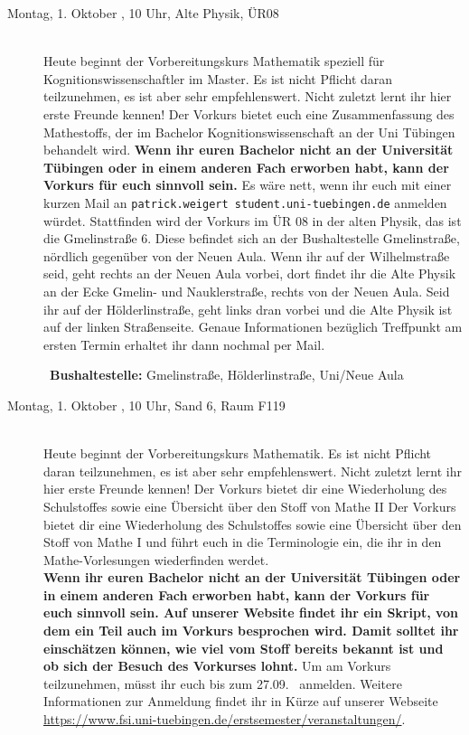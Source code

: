 \begin{description}

\ifkogwiss
\ifmaster
\item[Montag, 1. Oktober \Jahr, 10 Uhr, Alte Physik, ÜR08]\ \\
Heute beginnt der Vorbereitungskurs Mathematik speziell für Kognitionswissenschaftler im Master. Es ist nicht Pflicht daran teilzunehmen, es ist aber sehr empfehlenswert. Nicht zuletzt lernt ihr hier erste Freunde kennen! Der Vorkurs bietet euch eine Zusammenfassung des Mathestoffs, der im Bachelor Kognitionswissenschaft an der Uni Tübingen behandelt wird.
\textbf{Wenn ihr euren Bachelor nicht an der Universität Tübingen oder in einem anderen Fach erworben habt, kann der Vorkurs für euch sinnvoll sein.} Es wäre nett, wenn ihr euch mit einer kurzen Mail an \texttt{patrick.weigert \At student.uni-tuebingen.de} anmelden würdet.
Stattfinden wird der Vorkurs im ÜR 08 in der alten Physik, das ist die Gmelinstraße 6. Diese befindet sich an der Bushaltestelle Gmelinstraße, nördlich gegenüber von der Neuen Aula. Wenn ihr auf der Wilhelmstraße seid, geht rechts an der Neuen Aula vorbei, dort findet ihr die Alte Physik an der Ecke Gmelin- und Nauklerstraße, rechts von der Neuen Aula. Seid ihr auf der Hölderlinstraße, geht links dran vorbei und die Alte Physik ist auf der linken Straßenseite. Genaue Informationen bezüglich Treffpunkt am ersten Termin erhaltet ihr dann nochmal per Mail.

~\textbf{Bushaltestelle:} Gmelinstraße, Hölderlinstraße, Uni/Neue Aula

\else
\item[Montag, 1. Oktober \Jahr, 10 Uhr, Sand 6, Raum F119]\ \\
Heute beginnt der Vorbereitungskurs Mathematik. Es ist nicht Pflicht daran teilzunehmen,
es ist aber sehr empfehlenswert. Nicht zuletzt lernt ihr hier erste Freunde kennen!
\ifsommersemester
Der Vorkurs bietet dir eine Wiederholung des Schulstoffes sowie eine Übersicht über den Stoff von Mathe II
\fi
\ifwintersemester
Der Vorkurs bietet dir eine Wiederholung des Schulstoffes sowie eine Übersicht über den Stoff von Mathe I
\fi
und führt euch in die Terminologie ein, die ihr in den Mathe-Vorlesungen wiederfinden werdet.
\ifmaster
\\
\textbf{Wenn ihr euren Bachelor nicht an der Universität Tübingen oder in einem anderen Fach erworben habt, kann der Vorkurs für euch sinnvoll sein. Auf unserer Website findet ihr ein Skript, von dem ein Teil auch im Vorkurs besprochen wird. Damit solltet ihr einschätzen können, wie viel vom Stoff bereits bekannt ist und ob sich der Besuch des Vorkurses lohnt.}
\fi
Um am Vorkurs teilzunehmen, müsst ihr euch bis zum 27.09. \Jahr~anmelden. Weitere Informationen zur Anmeldung findet ihr in Kürze auf unserer Webseite \url{https://www.fsi.uni-tuebingen.de/erstsemester/veranstaltungen/}.


\end{description}
